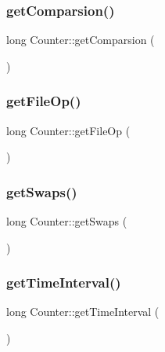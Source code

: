 \subsubsection{\texorpdfstring{get\+Comparsion()}{getComparsion()}}
{\footnotesize\ttfamily long Counter\+::get\+Comparsion (\begin{DoxyParamCaption}{ }\end{DoxyParamCaption})}

\hypertarget{class_counter_ac0a53b0296d0eacca2a2391a12ae39c5}{}\label{class_counter_ac0a53b0296d0eacca2a2391a12ae39c5} 
\subsubsection{\texorpdfstring{get\+File\+Op()}{getFileOp()}}
{\footnotesize\ttfamily long Counter\+::get\+File\+Op (\begin{DoxyParamCaption}{ }\end{DoxyParamCaption})}

\hypertarget{class_counter_af20f10e30e8bd1d078d1d66c518a814c}{}\label{class_counter_af20f10e30e8bd1d078d1d66c518a814c} 
\subsubsection{\texorpdfstring{get\+Swaps()}{getSwaps()}}
{\footnotesize\ttfamily long Counter\+::get\+Swaps (\begin{DoxyParamCaption}{ }\end{DoxyParamCaption})}

\hypertarget{class_counter_a25b1a1a6cd43fb23c2d1563d5b05aec6}{}\label{class_counter_a25b1a1a6cd43fb23c2d1563d5b05aec6} 
\subsubsection{\texorpdfstring{get\+Time\+Interval()}{getTimeInterval()}}
{\footnotesize\ttfamily long Counter\+::get\+Time\+Interval (\begin{DoxyParamCaption}{ }\end{DoxyParamCaption})}

\hypertarget{class_counter_a224d93150c0fe2982d3efd7aa99668e6}{}\label{class_counter_a224d93150c0fe2982d3efd7aa99668e6} 

